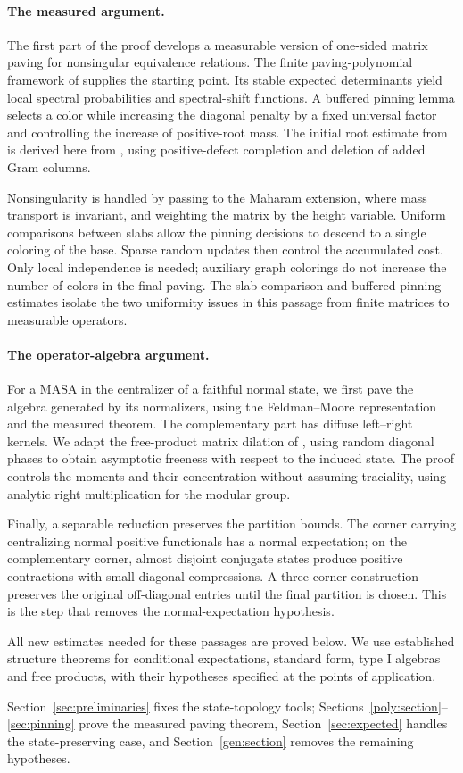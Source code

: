 \paragraph{The measured argument.}
The first part of the proof develops a measurable version of
one-sided matrix paving for nonsingular equivalence relations.
The finite paving-polynomial framework of
\cite{RL20,RS21} supplies the starting point. Its stable expected
determinants yield local spectral probabilities and spectral-shift
functions.
A buffered pinning lemma selects a color while increasing the
diagonal penalty by a fixed universal factor and controlling the
increase of positive-root mass.
The initial root estimate from \cite[Lemma~24 and proof of Theorem~25]{RS21}
is derived here from \cite[Theorems~4.1 and~5.1]{MSS15}, using
positive-defect completion and deletion of added Gram columns.

Nonsingularity is handled by passing to the Maharam extension, where
mass transport is invariant, and weighting the matrix by the height
variable. Uniform comparisons between slabs allow the pinning
decisions to descend to a single coloring of the base.
Sparse random updates then control the accumulated cost.
Only local independence is needed; auxiliary graph colorings do not
increase the number of colors in the final paving.
The slab comparison and buffered-pinning estimates isolate the two
uniformity issues in this passage from finite matrices to measurable
operators.

\paragraph{The operator-algebra argument.}
For a MASA in the centralizer of a faithful normal state, we first pave
the algebra generated by its normalizers, using the
Feldman--Moore representation \cite{FM77} and the measured theorem.
The complementary part has diffuse left--right kernels.
We adapt the free-product matrix dilation of
\cite[proof of Theorem~5.1]{PV15}, using random diagonal phases to
obtain asymptotic freeness with respect to the induced state.
The proof controls the moments and their concentration without assuming
traciality, using analytic right multiplication for the modular group.

Finally, a separable reduction preserves the partition bounds.
The corner carrying centralizing normal positive functionals has a
normal expectation; on the complementary corner, almost disjoint
conjugate states produce positive contractions with small diagonal
compressions. A three-corner construction preserves the original
off-diagonal entries until the final partition is chosen.
This is the step that removes the normal-expectation hypothesis.

All new estimates needed for these passages are proved below.
We use established structure theorems for conditional expectations,
standard form, type I algebras and free products, with their hypotheses
specified at the points of application.

Section~\ref{sec:preliminaries} fixes the state-topology tools;
Sections~\ref{poly:section}--\ref{sec:pinning} prove the measured paving
theorem, Section~\ref{sec:expected} handles the state-preserving case,
and Section~\ref{gen:section} removes the remaining hypotheses.
